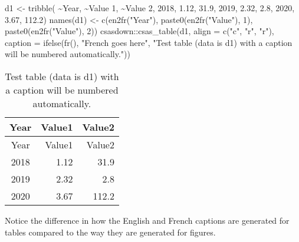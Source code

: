 \documentclass[12pt]{article}\usepackage[]{graphicx}\usepackage[]{color}
\newenvironment{Shaded}{\begin{snugshade}}{\end{snugshade}}
\newcommand{\AttributeTok}[1]{\textcolor[rgb]{0.77,0.63,0.00}{#1}}
\newcommand{\DecValTok}[1]{\textcolor[rgb]{0.00,0.00,0.81}{#1}}
\newcommand{\FloatTok}[1]{\textcolor[rgb]{0.00,0.00,0.81}{#1}}
\newcommand{\FunctionTok}[1]{\textcolor[rgb]{0.00,0.00,0.00}{#1}}
\newcommand{\NormalTok}[1]{#1}
\newcommand{\OtherTok}[1]{\textcolor[rgb]{0.56,0.35,0.01}{#1}}
\newcommand{\SpecialCharTok}[1]{\textcolor[rgb]{0.00,0.00,0.00}{#1}}
\newcommand{\StringTok}[1]{\textcolor[rgb]{0.31,0.60,0.02}{#1}}
\begin{document}
\begin{Shaded}
\begin{Highlighting}[]
\NormalTok{d1 }\OtherTok{\textless{}{-}} \FunctionTok{tribble}\NormalTok{(}
  \SpecialCharTok{\textasciitilde{}}\NormalTok{Year, }\SpecialCharTok{\textasciitilde{}}\StringTok{\textasciigrave{}}\AttributeTok{Value 1}\StringTok{\textasciigrave{}}\NormalTok{, }\SpecialCharTok{\textasciitilde{}}\StringTok{\textasciigrave{}}\AttributeTok{Value 2}\StringTok{\textasciigrave{}}\NormalTok{,}
   \DecValTok{2018}\NormalTok{,       }\FloatTok{1.12}\NormalTok{,       }\FloatTok{31.9}\NormalTok{,}
   \DecValTok{2019}\NormalTok{,       }\FloatTok{2.32}\NormalTok{,        }\FloatTok{2.8}\NormalTok{,}
   \DecValTok{2020}\NormalTok{,       }\FloatTok{3.67}\NormalTok{,      }\FloatTok{112.2}\NormalTok{)}
\FunctionTok{names}\NormalTok{(d1) }\OtherTok{\textless{}{-}} \FunctionTok{c}\NormalTok{(}\FunctionTok{en2fr}\NormalTok{(}\StringTok{"Year"}\NormalTok{),}
               \FunctionTok{paste0}\NormalTok{(}\FunctionTok{en2fr}\NormalTok{(}\StringTok{"Value"}\NormalTok{), }\DecValTok{1}\NormalTok{),}
               \FunctionTok{paste0}\NormalTok{(}\FunctionTok{en2fr}\NormalTok{(}\StringTok{"Value"}\NormalTok{), }\DecValTok{2}\NormalTok{))}
\NormalTok{csasdown}\SpecialCharTok{::}\FunctionTok{csas\_table}\NormalTok{(d1,}
  \AttributeTok{align =} \FunctionTok{c}\NormalTok{(}\StringTok{"c"}\NormalTok{, }\StringTok{"r"}\NormalTok{, }\StringTok{"r"}\NormalTok{),}
  \AttributeTok{caption =} \FunctionTok{ifelse}\NormalTok{(}\FunctionTok{fr}\NormalTok{(),}
                   \StringTok{"French goes here"}\NormalTok{,}
                   \StringTok{"Test table (data is d1) with a caption will be numbered automatically."}\NormalTok{))}
\end{Highlighting}
\end{Shaded}
\begin{longtable}[]{@{}crr@{}}
\caption{\label{tab:testtab2}Test table (data is d1) with a caption will be numbered automatically.}\tabularnewline
\toprule()
Year & Value1 & Value2 \\
\midrule()
\endfirsthead
\toprule()
Year & Value1 & Value2 \\
\midrule()
\endhead
2018 & 1.12 & 31.9 \\
2019 & 2.32 & 2.8 \\
2020 & 3.67 & 112.2 \\
\bottomrule()
\end{longtable}
Notice the difference in how the English and French captions are generated for tables compared to the way they are generated for figures.
\end{document}
